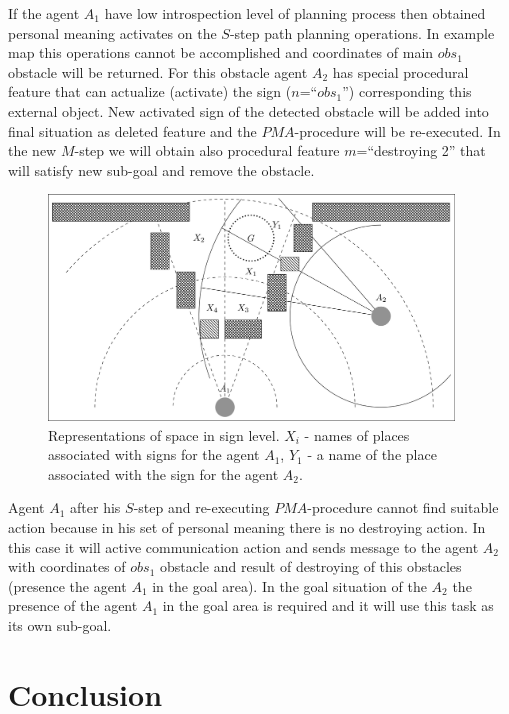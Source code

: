 \documentclass[runningheads,a4paper]{llncs}
\begin{document}
If the agent $A_1$ have low introspection level of planning process then obtained personal meaning activates on the $S$-step path planning operations. In example map this operations cannot be accomplished and coordinates of main $obs_1$ obstacle will be returned. For this obstacle agent $A_2$ has special procedural feature that can actualize (activate) the sign ($n$=``$obs_1$'') corresponding this external object. New activated sign of the detected obstacle will be added into final situation as deleted feature and the $PMA$-procedure will be re-executed. In the new $M$-step we will obtain also procedural feature $m$=``destroying 2'' that will satisfy new sub-goal and remove the obstacle.

\begin{figure}
	\centering
	\includegraphics[height=6cm]{rita_ex_proc}
	\caption{Representations of space in sign level. $X_i$ - names of places associated with signs for the agent $A_1$, $Y_1$ - a name of the place associated with the sign for the agent $A_2$.}
	\label{fig:example}
\end{figure}

Agent $A_1$ after his $S$-step and re-executing $PMA$-procedure cannot find suitable action because in his set of personal meaning there is no destroying action. In this case it will active communication action and sends message to the agent $A_2$ with coordinates of $obs_1$ obstacle and result of destroying of this obstacles (presence the agent $A_1$ in the goal area). In the goal situation of the $A_2$ the presence of the agent $A_1$ in the goal area is required and it will use this task as its own sub-goal.

\section{Conclusion}
\end{document}
